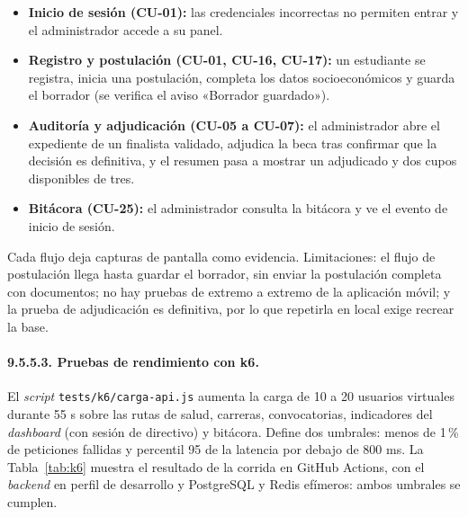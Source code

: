 \begin{itemize}
    \item \textbf{Inicio de sesión (CU-01):} las credenciales incorrectas no permiten entrar y el administrador accede a su panel.
    \item \textbf{Registro y postulación (CU-01, CU-16, CU-17):} un estudiante se registra, inicia una postulación, completa los datos socioeconómicos y guarda el borrador (se verifica el aviso «Borrador guardado»).
    \item \textbf{Auditoría y adjudicación (CU-05 a CU-07):} el administrador abre el expediente de un finalista validado, adjudica la beca tras confirmar que la decisión es definitiva, y el resumen pasa a mostrar un adjudicado y dos cupos disponibles de tres.
    \item \textbf{Bitácora (CU-25):} el administrador consulta la bitácora y ve el evento de inicio de sesión.
\end{itemize}

Cada flujo deja capturas de pantalla como evidencia. Limitaciones: el flujo de postulación llega hasta guardar el borrador, sin enviar la postulación completa con documentos; no hay pruebas de extremo a extremo de la aplicación móvil; y la prueba de adjudicación es definitiva, por lo que repetirla en local exige recrear la base.

\paragraph{9.5.5.3. Pruebas de rendimiento con k6.}

El \textit{script} \texttt{tests/k6/carga-api.js} aumenta la carga de 10 a 20 usuarios virtuales durante 55 s sobre las rutas de salud, carreras, convocatorias, indicadores del \textit{dashboard} (con sesión de directivo) y bitácora. Define dos umbrales: menos de 1\,\% de peticiones fallidas y percentil 95 de la latencia por debajo de 800 ms. La Tabla~\ref{tab:k6} muestra el resultado de la corrida en GitHub Actions, con el \textit{backend} en perfil de desarrollo y PostgreSQL y Redis efímeros: ambos umbrales se cumplen.


